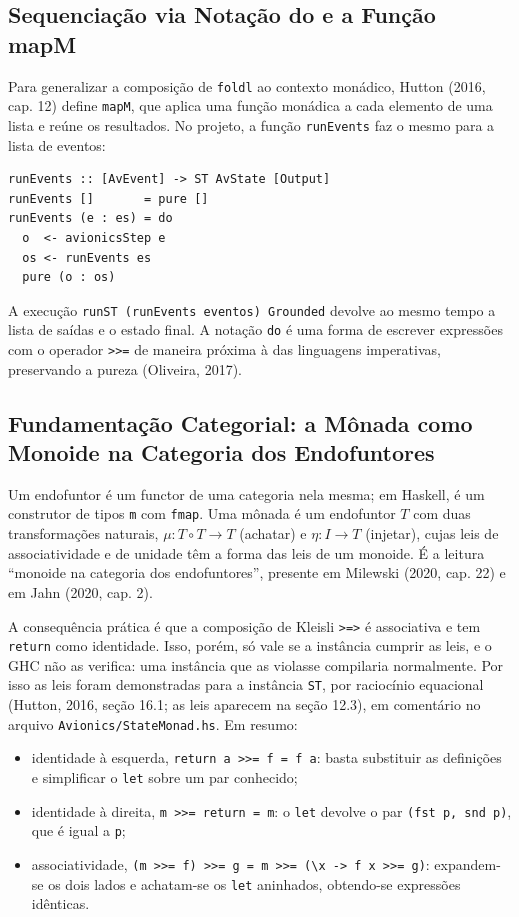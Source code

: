 \documentclass[12pt,a4paper]{article}
\begin{document}
\subsection{Sequenciação via Notação do e a Função mapM}

Para generalizar a composição de \texttt{foldl} ao contexto monádico, Hutton (2016, cap. 12) define \texttt{mapM}, que aplica uma função monádica a cada elemento de uma lista e reúne os resultados. No projeto, a função \texttt{runEvents} faz o mesmo para a lista de eventos:

\begin{verbatim}
runEvents :: [AvEvent] -> ST AvState [Output]
runEvents []       = pure []
runEvents (e : es) = do
  o  <- avionicsStep e
  os <- runEvents es
  pure (o : os)
\end{verbatim}

A execução \texttt{runST (runEvents eventos) Grounded} devolve ao mesmo tempo a lista de saídas e o estado final. A notação \texttt{do} é uma forma de escrever expressões com o operador \texttt{>>=} de maneira próxima à das linguagens imperativas, preservando a pureza (Oliveira, 2017).

\subsection{Fundamentação Categorial: a Mônada como Monoide na Categoria dos Endofuntores}

Um endofuntor é um functor de uma categoria nela mesma; em Haskell, é um construtor de tipos \texttt{m} com \texttt{fmap}. Uma mônada é um endofuntor $T$ com duas transformações naturais, $\mu : T \circ T \to T$ (achatar) e $\eta : I \to T$ (injetar), cujas leis de associatividade e de unidade têm a forma das leis de um monoide. É a leitura ``monoide na categoria dos endofuntores'', presente em Milewski (2020, cap. 22) e em Jahn (2020, cap. 2).

A consequência prática é que a composição de Kleisli \texttt{>=>} é associativa e tem \texttt{return} como identidade. Isso, porém, só vale se a instância cumprir as leis, e o GHC não as verifica: uma instância que as violasse compilaria normalmente. Por isso as leis foram demonstradas para a instância \texttt{ST}, por raciocínio equacional (Hutton, 2016, seção 16.1; as leis aparecem na seção 12.3), em comentário no arquivo \texttt{Avionics/StateMonad.hs}. Em resumo:

\begin{itemize}
\item identidade à esquerda, \texttt{return a >>= f = f a}: basta substituir as definições e simplificar o \texttt{let} sobre um par conhecido;
\item identidade à direita, \texttt{m >>= return = m}: o \texttt{let} devolve o par \texttt{(fst p, snd p)}, que é igual a \texttt{p};
\item associatividade, \texttt{(m >>= f) >>= g = m >>= (\textbackslash x -> f x >>= g)}: expandem-se os dois lados e achatam-se os \texttt{let} aninhados, obtendo-se expressões idênticas.
\end{itemize}
\end{document}
